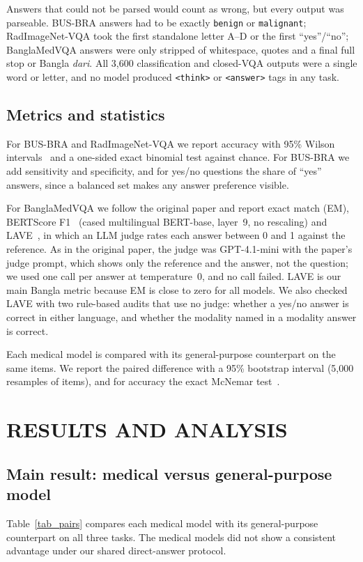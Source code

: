 \documentclass[doublecolumn]{ijcvsplatex}
\begin{document}
Answers that could not be parsed would count as wrong, but every output was parseable. BUS-BRA answers had to be exactly \texttt{benign} or \texttt{malignant}; RadImageNet-VQA took the first standalone letter A--D or the first ``yes''/``no''; BanglaMedVQA answers were only stripped of whitespace, quotes and a final full stop or Bangla \emph{dari}. All 3,600 classification and closed-VQA outputs were a single word or letter, and no model produced \texttt{<think>} or \texttt{<answer>} tags in any task.

\subsection{Metrics and statistics}
For BUS-BRA and RadImageNet-VQA we report accuracy with 95\% Wilson intervals~\cite{wilson1927} and a one-sided exact binomial test against chance. For BUS-BRA we add sensitivity and specificity, and for yes/no questions the share of ``yes'' answers, since a balanced set makes any answer preference visible.

For BanglaMedVQA we follow the original paper and report exact match (EM), BERTScore F1~\cite{zhang2020bertscore} (cased multilingual BERT-base, layer~9, no rescaling) and LAVE~\cite{manas2024lave}, in which an LLM judge rates each answer between 0 and 1 against the reference. As in the original paper, the judge was GPT-4.1-mini with the paper's judge prompt, which shows only the reference and the answer, not the question; we used one call per answer at temperature~0, and no call failed. LAVE is our main Bangla metric because EM is close to zero for all models. We also checked LAVE with two rule-based audits that use no judge: whether a yes/no answer is correct in either language, and whether the modality named in a modality answer is correct.

Each medical model is compared with its general-purpose counterpart on the same items. We report the paired difference with a 95\% bootstrap interval (5,000 resamples of items), and for accuracy the exact McNemar test~\cite{mcnemar1947}.

\section{RESULTS AND ANALYSIS}
\label{sec_results}

\subsection{Main result: medical versus general-purpose model}
\label{sec_res_main}
Table~\ref{tab_pairs} compares each medical model with its general-purpose counterpart on all three tasks. The medical models did not show a consistent advantage under our shared direct-answer protocol.
\end{document}

